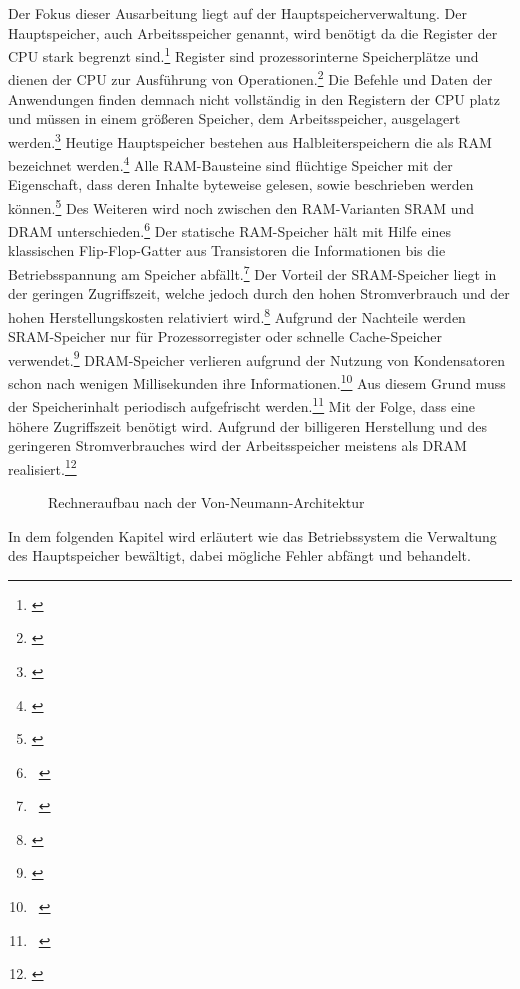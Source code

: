 Der Fokus dieser Ausarbeitung liegt auf der Hauptspeicherverwaltung. Der Hauptspeicher, auch Arbeitsspeicher genannt, wird benötigt da die Register der \ac{CPU} stark begrenzt sind.\footnote{\cite[S.~107]{Herold.2012}} Register sind prozessorinterne Speicherplätze und dienen der \ac{CPU} zur Ausführung von Operationen.\footnote{\cite[S.~98]{Herold.2012}} Die Befehle und Daten der Anwendungen finden demnach nicht vollständig in den Registern der \ac{CPU} platz und müssen in einem größeren Speicher, dem Arbeitsspeicher, ausgelagert werden.\footnote{\cite[S.~107]{Herold.2012}} Heutige Hauptspeicher bestehen aus Halbleiterspeichern die als \ac{RAM} bezeichnet werden.\footnote{\cite[S.~108]{Herold.2012}} Alle RAM-Bausteine sind flüchtige Speicher mit der Eigenschaft, dass deren Inhalte byteweise gelesen, sowie beschrieben werden können.\footnote{\cite[S.~108]{Herold.2012}} Des Weiteren wird noch zwischen den \ac{RAM}-Varianten \ac{SRAM}  und \ac{DRAM} unterschieden.\footnote{~\cite[S.~182]{Haberlein.2011}} Der statische \ac{RAM}-Speicher hält mit Hilfe eines klassischen Flip-Flop-Gatter aus Transistoren die Informationen bis die Betriebsspannung am Speicher abfällt.\footnote{~\cite[S.~182]{Haberlein.2011}} Der Vorteil der \ac{SRAM}-Speicher liegt in der geringen Zugriffszeit, welche jedoch durch den hohen Stromverbrauch und der hohen Herstellungskosten relativiert wird.\footnote{\cite[S.~108]{Herold.2012}} Aufgrund der Nachteile werden \ac{SRAM}-Speicher nur für Prozessorregister oder schnelle Cache-Speicher verwendet.\footnote{\cite[S.~108]{Herold.2012}} \ac{DRAM}-Speicher verlieren aufgrund der Nutzung von Kondensatoren schon nach wenigen Millisekunden ihre Informationen.\footnote{~\cite[S.~183]{Haberlein.2011}} Aus diesem Grund muss der Speicherinhalt periodisch aufgefrischt werden.\footnote{~\cite[S.~183]{Haberlein.2011}} Mit der Folge, dass eine höhere Zugriffszeit benötigt wird. Aufgrund der billigeren Herstellung und des geringeren Stromverbrauches wird der Arbeitsspeicher meistens als \ac{DRAM} realisiert.\footnote{\cite[S.~109]{Herold.2012}}

\begin{figure}[htb]
	\centering
	\caption{Rechneraufbau nach der Von-Neumann-Architektur}
\end{figure}

In dem folgenden Kapitel wird erläutert wie das Betriebssystem die Verwaltung des Hauptspeicher bewältigt, dabei mögliche Fehler abfängt und behandelt.
